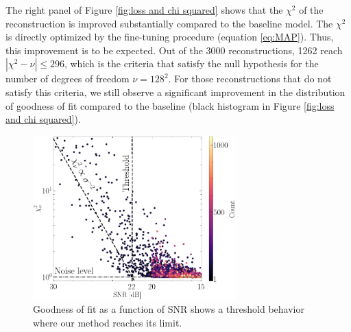 The right panel of Figure \ref{fig:loss and chi squared} shows that 
the $\chi^2$ of the reconstruction is improved substantially compared to the 
baseline model. The $\chi^2$ is directly optimized by the fine-tuning procedure 
(equation \eqref{eq:MAP}). Thus, this improvement is to be expected. 
Out of the 
3000 reconstructions, 1262 reach $|\chi^2 - \nu| \leq 296$, which is the criteria 
that satisfy the null hypothesis for the number of degrees of freedom 
$\nu=128^{2}$. For those reconstructions that do not satisfy this criteria, 
we still observe a significant improvement in the distribution of goodness of fit 
compared to the baseline (black histogram in Figure \ref{fig:loss and chi squared}).

\begin{figure}[t!]
        \centering
        \includegraphics[width=0.7\textwidth]{figures/chisq_vs_noise_ewc}
        \caption{Goodness of fit as a function of SNR shows a threshold 
        behavior where our method reaches its limit.}
        \label{fig:chi squared vs noise}
\end{figure}

